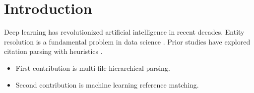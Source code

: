 \section{Introduction}
Deep learning has revolutionized artificial intelligence in recent decades.
Entity resolution is a fundamental problem in data science \cite{vaswani2017attention}.
Prior studies have explored citation parsing with heuristics \cite{devlin2018bert}.

\begin{itemize}
\item First contribution is multi-file hierarchical parsing.
\item Second contribution is machine learning reference matching.
\end{itemize}
